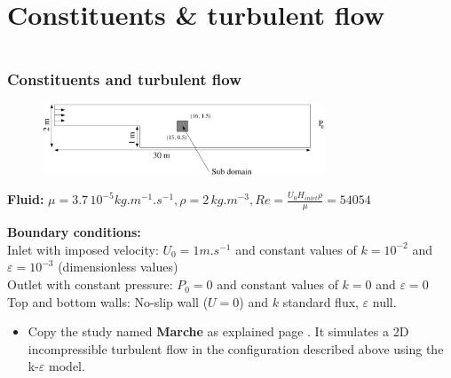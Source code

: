 \documentclass[10pt, hyperref={unicode=true,pdfusetitle, bookmarks=true,bookmarksnumbered=false,bookmarksopen=false, breaklinks=false,pdfborder={0 0 1},backref=true,colorlinks=true,linkcolor=darkblue,pageanchor}]{beamer}
\begin{document}


\section{{\bf{Constituents \& turbulent flow}}}
\begin{frame}
\begin{columns}[c] 
\tableofcontents[sections={1-9},currentsection, currentsubsection]
\tableofcontents[sections={10-16},currentsection, currentsubsection]
\end{columns}
\end{frame}
\begin{frame}
\frametitle{Constituents and turbulent flow}
\begin{block}{}

\begin{figure}
\includegraphics[width=0.75\textwidth]{PICTURES/marche.pdf}
\end{figure}

\textbf{Fluid:} $\mu=3.7 \, 10^{-5} kg.m^{-1}.s^{-1}, \rho=2 \, kg.m^{-3}, Re=\frac{U_0 H_{inlet} \rho}{\mu} =54054$

\textbf{Boundary conditions:} \\
Inlet with imposed velocity: $U_0=1 m.s^{-1}$ and constant values of $k=10^{-2}$ and $\varepsilon=10^{-3}$ (dimensionless values)\\
Outlet with constant pressure: $P_0=0$ and constant values of $k=0$ and $\varepsilon=0$ \\
Top and bottom walls: No-slip wall ($U=0$) and $k$ standard flux, $\varepsilon$ null.

\begin{itemize}
\item Copy the study named \textbf{Marche} as explained page \pageref{method_copy}. It simulates a 2D incompressible turbulent flow in the configuration described above using the k-$\varepsilon$ model.
\end{itemize}

\end{block}
\end{frame}
\end{document}
